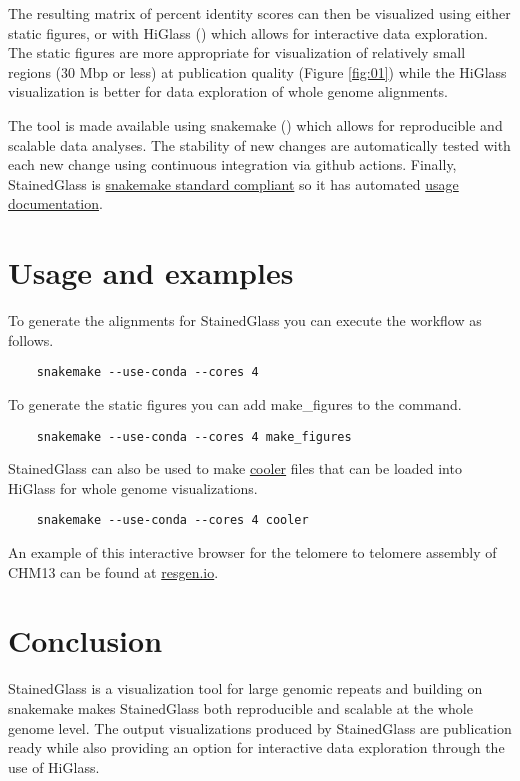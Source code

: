 \documentclass{bioinfo}
\begin{document}
The resulting matrix of percent identity scores can then be visualized using
either static figures, or with HiGlass (\citealp{Kerpedjiev2018-nf}) which allows for interactive data
exploration. The static figures are more appropriate for visualization of 
relatively small regions (30 Mbp or less) at publication quality (Figure
\ref{fig:01}) while the HiGlass visualization is better for data exploration of
whole genome alignments.

The tool is made available using snakemake
(\citealp{Koster2012-fs,Koster2018-ef,Molder2021-xm}) which allows for
reproducible and scalable data analyses. The stability of new changes are
automatically tested with each new change using continuous integration via
github actions. Finally, StainedGlass is
\href{snakemake.github.io/snakemake-workflow-catalog?rules=true}{snakemake
standard compliant} so it has automated
\href{snakemake.github.io/snakemake-workflow-catalog?usage=mrvollger/StainedGlass}{usage
documentation}.

\section{Usage and examples}
To generate the alignments for StainedGlass you can
execute the workflow as follows. 
\begin{lstlisting} 
	snakemake --use-conda --cores 4 
\end{lstlisting}

To generate the static figures you can add make\_figures to the command.  
\begin{lstlisting} 
	snakemake --use-conda --cores 4 make_figures
\end{lstlisting}

StainedGlass can also be used to make
\href{github.com/open2c/cooler}{cooler} files that can be loaded into
HiGlass for whole genome visualizations.
\begin{lstlisting} 
	snakemake --use-conda --cores 4 cooler
\end{lstlisting} 
An example of this interactive browser for the telomere to telomere assembly of CHM13 can be found at 
\href{resgen.io/paper-data/T2T/views/MtjcVgrlQmymnHIvdck5-g}{resgen.io}.

\section{Conclusion}

StainedGlass is a visualization tool for large genomic repeats and building on
snakemake makes StainedGlass both reproducible and scalable at the whole genome
level. The output visualizations produced by StainedGlass are publication ready
while also providing an option for interactive data exploration through the use
of HiGlass.
\end{document}
